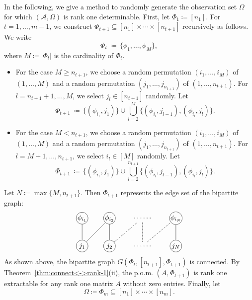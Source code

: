 \documentclass{amsart}
\newcommand{\mc}[1]{\mathcal{#1}}
\newcommand{\ddd}{,\ldots,}
\newcommand{\bit}{\begin{itemize}}
\newcommand{\eit}{\end{itemize}}
\newcommand{\be}{\begin{equation}}
\newcommand{\ee}{\end{equation}}
\theoremstyle{definition}
\numberwithin{equation}{section}
\begin{document}
In the following, 
we give a method to randomly generate the observation set $\Omega$ for which $(\mc{A}, \Omega)$ is rank one determinable.
First, let $\Phi_1 \coloneqq [n_1]$.
For $t = 1 \ddd m-1$, we construct 
$
\Phi_{t+1} \subseteq [n_1] \times \cdots \times [n_{t+1}]
$
recursively as follows.
We write
\be
\Phi_t \,\coloneqq\, \{  \phi_1 \ddd \phi_{M} \},
\ee
where $M \coloneqq |\Phi_t|$ is the cardinality of $\Phi_t$.
\bit
\item For the case $M \ge n_{t+1}$,
we choose a random permutation $( i_1 \ddd i_M )$ of $(1 \ddd M)$ and 
a random permutation $(j_1 \ddd j_{n_{t+1}})$ of $(1 \ddd n_{t+1})$.
For $l = n_{t+1}+1 \ddd M$, we select $j_l \in [n_{t+1}]$ randomly.
Let
\be
\Phi_{t+1} \,\coloneqq\, \{(\phi_{i_1}, j_1)\} \cup 
\bigcup_{l=2}^{M} \big\{ (\phi_{i_l}, j_{l-1}), (\phi_{i_l}, j_l) \big\}.
\ee

\item For the case $M < n_{t+1}$,
we choose a random permutation $( i_1 \ddd i_M )$ of $(1 \ddd M)$ and 
a random permutation $( j_1 \ddd j_{n_{t+1}} )$ of $(1 \ddd n_{t+1})$.
For $l = M+1 \ddd n_{t+1}$, we select $i_l \in [M]$ randomly.
Let
\be
\Phi_{t+1} \,\coloneqq\, \{(\phi_{i_1}, j_1)\} \cup 
\bigcup_{l=2}^{n_{t+1}} \big\{ (\phi_{i_l}, j_{l-1}), (\phi_{i_l}, j_l) \big\}.
\ee
\eit
Let $N \coloneqq \max\{ M, n_{t+1} \}$. 
Then $\Phi_{t+1}$ represents the edge set of the bipartite graph:
\be\label{con_path:phi-j}
\begin{tikzcd}[column sep=2.2em,row sep=2.2em]
|[draw,circle,minimum size=6mm,inner sep=0pt]| {\phi_{i_1}}
& |[draw,circle,minimum size=6mm,inner sep=0pt]| {\phi_{i_2}}
& \cdots\cdots
& |[draw,circle,minimum size=6mm,inner sep=0pt]| {\phi_{i_N}} \\
|[draw,circle,minimum size=6mm,inner sep=0pt]| {j_1}
& |[draw,circle,minimum size=6mm,inner sep=0pt]| {j_2}
& \cdots\cdots
& |[draw,circle,minimum size=6mm,inner sep=0pt]| {j_N}
\arrow[no head, from=1-1, to=2-1]
\arrow[no head, from=1-2, to=2-2]
\arrow[dashed, no head, from=1-3, to=2-3]
\arrow[no head, from=1-4, to=2-4]
\arrow[no head, from=2-1, to=1-2]
\arrow[dashed, no head, from=2-2, to=1-3]
\arrow[dashed, no head, from=2-3, to=1-4]
\end{tikzcd}
\ee
As shown above, the bipartite graph $G(\Phi_t, [n_{t+1}], \Phi_{t+1})$ is connected.
By Theorem~\ref{thm:connect<->rank-1}(ii), the p.o.m. $(A, \Phi_{t+1})$ is rank one extractable for any rank one matrix $A$ without zero entries.
Finally, let
\be
\Omega \coloneqq \Phi_m \subseteq [n_1] \times \cdots \times [n_m].
\ee
\end{document}
